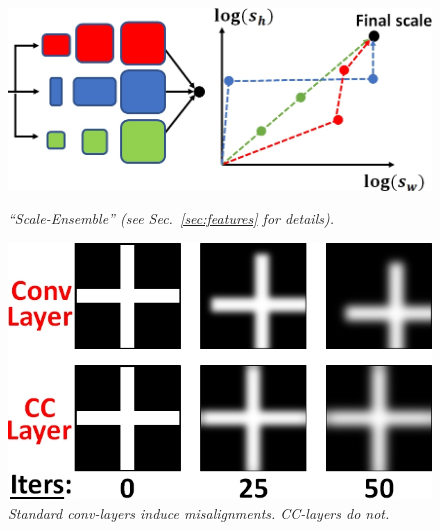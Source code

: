 \begin{figure}
\hspace{-0cm}
\centering
\begin{minipage}{.45\textwidth}
    \hspace{-1cm}
    \includegraphics[width=1\textwidth]{figs/fig_scale_ensemble_Michal.jpg}
     \caption{\it ``Scale-Ensemble'' (see Sec.~\ref{sec:features}  for details).}
    \label{fig:scale_ensemble}
\end{minipage}%
  \hspace{0.3cm}
  \begin{minipage}{.3\textwidth}
  \centering
  \includegraphics[width=1\textwidth]{figs/fig_misalign_Michal.jpg}
  \caption{\it Standard conv-layers induce misalignments.  CC-layers do not.}
  \label{fig:fig_missalign}
    \end{minipage}
   \vspace*{-0.5cm}
\end{figure}